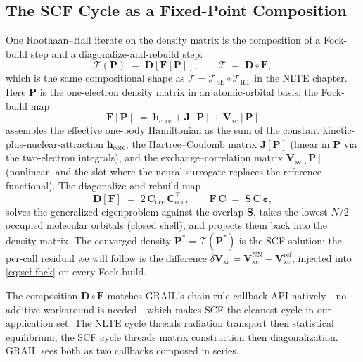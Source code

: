 \documentclass[11pt]{article}
\newcommand{\Tcyc}{\mathcal{T}}
\newcommand{\Trt}{\Tcyc_{\mathrm{RT}}}
\newcommand{\Tse}{\Tcyc_{\mathrm{SE}}}
\begin{document}
\subsection{The SCF Cycle as a Fixed-Point Composition}
\label{sec:scf-cycle}

One Roothaan--Hall iterate on the density matrix is the composition
of a Fock-build step and a diagonalize-and-rebuild step:
\begin{equation}
\Tcyc(\mathbf{P}) \;=\; \mathbf{D}\!\left[\mathbf{F}[\mathbf{P}]\right],
\qquad
\Tcyc \;=\; \mathbf{D} \circ \mathbf{F} ,
\label{eq:scf-cycle}
\end{equation}
which is the same compositional shape as
$\Tcyc = \Tse \circ \Trt$ in the NLTE chapter.  Here $\mathbf{P}$ is
the one-electron density matrix in an atomic-orbital basis; the
Fock-build map
\begin{equation}
\mathbf{F}[\mathbf{P}] \;=\;
\mathbf{h}_{\text{core}} + \mathbf{J}[\mathbf{P}] + \mathbf{V}_{\text{xc}}[\mathbf{P}]
\label{eq:scf-fock}
\end{equation}
assembles the effective one-body Hamiltonian as the sum of the
constant kinetic-plus-nuclear-attraction $\mathbf{h}_{\text{core}}$,
the Hartree--Coulomb matrix $\mathbf{J}[\mathbf{P}]$ (linear in
$\mathbf{P}$ via the two-electron integrals), and the
exchange--correlation matrix $\mathbf{V}_{\text{xc}}[\mathbf{P}]$
(nonlinear, and the slot where the neural surrogate replaces the
reference functional).  The diagonalize-and-rebuild map
\begin{equation}
\mathbf{D}[\mathbf{F}] \;=\;
2\,\mathbf{C}_{\text{occ}}\,\mathbf{C}_{\text{occ}}^{\top},
\qquad
\mathbf{F}\,\mathbf{C} \;=\; \mathbf{S}\,\mathbf{C}\,\boldsymbol\varepsilon,
\label{eq:scf-density}
\end{equation}
solves the generalized eigenproblem against the overlap
$\mathbf{S}$, takes the lowest $N/2$ occupied molecular orbitals
(closed shell), and projects them back into the density matrix.  The
converged density $\mathbf{P}^{*} = \Tcyc(\mathbf{P}^{*})$ is the SCF
solution; the per-call residual we will follow is the difference
$\delta\mathbf{V}_{\text{xc}} =
\mathbf{V}_{\text{xc}}^{\text{NN}} -
\mathbf{V}_{\text{xc}}^{\text{ref}}$, injected into
\eqref{eq:scf-fock} on every Fock build.

The composition $\mathbf{D} \circ \mathbf{F}$ matches GRAIL's chain-rule
callback API natively---no additive workaround is needed---which
makes SCF the cleanest cycle in our application set.  The NLTE cycle
threads radiation transport then statistical equilibrium; the SCF
cycle threads matrix construction then diagonalization.  GRAIL sees
both as two callbacks composed in series.
\end{document}
